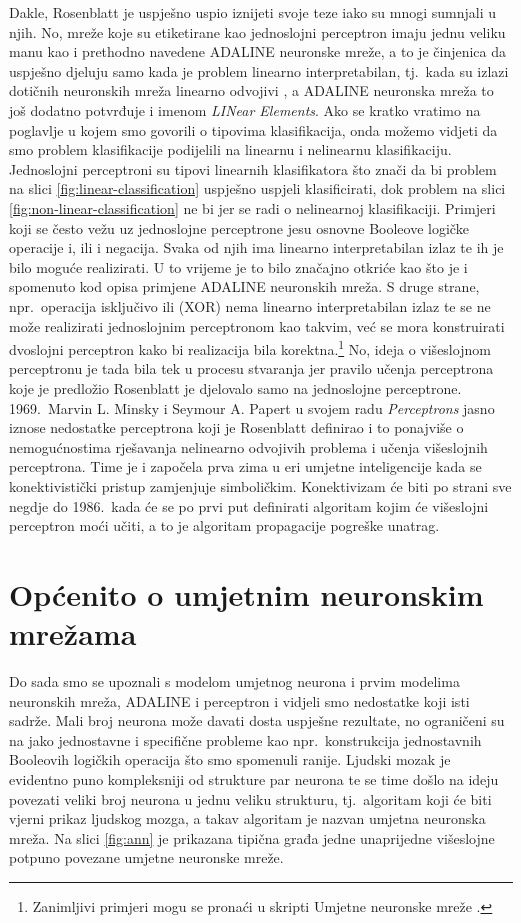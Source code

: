 \documentclass[times, utf8, zavrsni]{fer}
\begin{document}
Dakle, Rosenblatt je uspješno uspio iznijeti svoje teze iako su mnogi sumnjali u njih. No, mreže koje su etiketirane kao jednoslojni perceptron imaju jednu veliku manu kao i prethodno navedene ADALINE neuronske mreže, a to je činjenica da uspješno djeluju samo kada je problem linearno interpretabilan, tj.\ kada su izlazi dotičnih neuronskih mreža linearno odvojivi , a ADALINE neuronska mreža to još dodatno potvrđuje i imenom \textit{LINear Elements}. Ako se kratko vratimo na poglavlje u kojem smo govorili o tipovima klasifikacija, onda možemo vidjeti da smo problem klasifikacije podijelili na linearnu i nelinearnu klasifikaciju. Jednoslojni perceptroni su tipovi linearnih klasifikatora što znači da bi problem na slici \ref{fig:linear-classification} uspješno uspjeli klasificirati, dok problem na slici \ref{fig:non-linear-classification} ne bi jer se radi o nelinearnoj klasifikaciji. Primjeri koji se često vežu uz jednoslojne perceptrone jesu osnovne Booleove logičke operacije i, ili i negacija. Svaka od njih ima linearno interpretabilan izlaz te ih je bilo moguće realizirati. U to vrijeme je to bilo značajno otkriće kao što je i spomenuto kod opisa primjene ADALINE neuronskih mreža. S druge strane, npr.\ operacija isključivo ili (XOR) nema linearno interpretabilan izlaz te se ne može realizirati jednoslojnim perceptronom kao takvim, već se mora konstruirati dvoslojni perceptron kako bi realizacija bila korektna.\footnote{Zanimljivi primjeri mogu se pronaći u skripti Umjetne neuronske mreže \citep{cupicANN}.} No, ideja o višeslojnom perceptronu je tada bila tek u procesu stvaranja jer pravilo učenja perceptrona koje je predložio Rosenblatt je djelovalo samo na jednoslojne perceptrone. 1969.\ Marvin L. Minsky i Seymour A. Papert u svojem radu \textit{Perceptrons} jasno iznose nedostatke perceptrona koji je Rosenblatt definirao i to ponajviše o nemogućnostima rješavanja nelinearno odvojivih problema i učenja višeslojnih perceptrona. Time je i započela prva zima u eri umjetne inteligencije  kada se konektivistički pristup zamjenjuje simboličkim. Konektivizam će biti po strani sve negdje do 1986.\ kada će se po prvi put definirati algoritam kojim će višeslojni perceptron moći učiti, a to je algoritam propagacije pogreške unatrag.

\section{Općenito o umjetnim neuronskim mrežama}
Do sada smo se upoznali s modelom umjetnog neurona i prvim modelima neuronskih mreža, ADALINE i perceptron i vidjeli smo nedostatke koji isti sadrže. Mali broj neurona može davati dosta uspješne rezultate, no ograničeni su na jako jednostavne i  specifične probleme kao npr.\ konstrukcija jednostavnih Booleovih logičkih operacija što smo spomenuli ranije. Ljudski mozak je evidentno puno kompleksniji od strukture par neurona te se time došlo na ideju povezati veliki broj neurona u jednu veliku strukturu, tj.\ algoritam koji će biti vjerni prikaz ljudskog mozga, a takav algoritam je nazvan umjetna neuronska mreža. Na slici \ref{fig:ann} je prikazana tipična građa jedne unaprijedne višeslojne potpuno povezane umjetne neuronske mreže.
\end{document}
